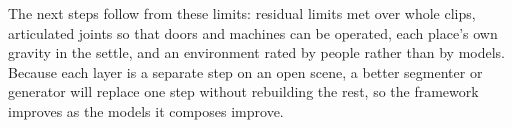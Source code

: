 The next steps follow from these limits: residual limits met over whole clips, articulated joints so that doors and machines can be operated, each place's own gravity in the settle, and an environment rated by people rather than by models. Because each layer is a separate step on an open scene, a better segmenter or generator will replace one step without rebuilding the rest, so the framework improves as the models it composes improve.
